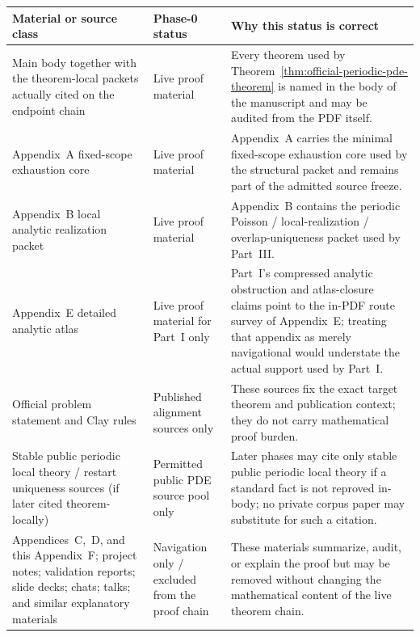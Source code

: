\begin{center}
\footnotesize
\renewcommand{\arraystretch}{1.16}
\setlength{\tabcolsep}{4pt}
\begin{tabularx}{0.98\textwidth}{@{}L{0.31\textwidth}L{0.20\textwidth}Y@{}}
\toprule
\textbf{Material or source class} & \textbf{Phase-0 status} & \textbf{Why this status is correct}\\
\midrule
Main body together with the theorem-local packets actually cited on the endpoint chain & Live proof material & Every theorem used by Theorem~\ref{thm:official-periodic-pde-theorem} is named in the body of the manuscript and may be audited from the PDF itself.\\
Appendix~A fixed-scope exhaustion core & Live proof material & Appendix~A carries the minimal fixed-scope exhaustion core used by the structural packet and remains part of the admitted source freeze.\\
Appendix~B local analytic realization packet & Live proof material & Appendix~B contains the periodic Poisson / local-realization / overlap-uniqueness packet used by Part~III.\\
Appendix~E detailed analytic atlas & Live proof material for Part~I only & Part~I's compressed analytic obstruction and atlas-closure claims point to the in-PDF route survey of Appendix~E; treating that appendix as merely navigational would understate the actual support used by Part~I.\\
Official problem statement and Clay rules \cite{fefferman-navierstokes-problem,cmi-millennium-rules} & Published alignment sources only & These sources fix the exact target theorem and publication context; they do not carry mathematical proof burden.\\
Stable public periodic local theory / restart uniqueness sources (if later cited theorem-locally) & Permitted public PDE source pool only & Later phases may cite only stable public periodic local theory if a standard fact is not reproved in-body; no private corpus paper may substitute for such a citation.\\
Appendices~C,~D, and this Appendix~F; project notes; validation reports; slide decks; chats; talks; and similar explanatory materials & Navigation only / excluded from the proof chain & These materials summarize, audit, or explain the proof but may be removed without changing the mathematical content of the live theorem chain.\\
\bottomrule
\end{tabularx}
\end{center}

